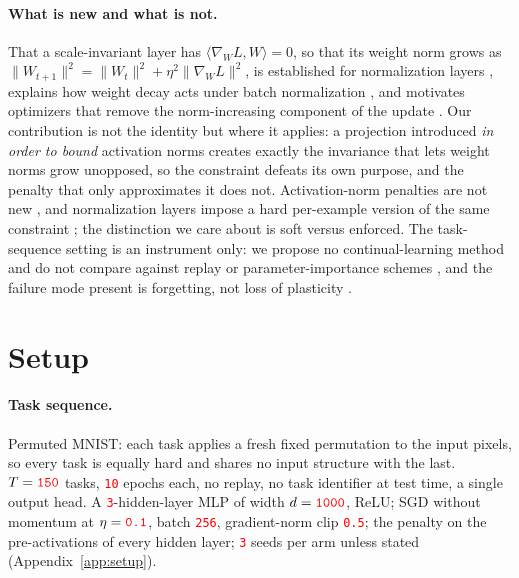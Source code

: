 \documentclass[anon]{opt2026}     %
\newcommand{\PH}[1]{\textcolor{red}{\texttt{#1}}}   %
\begin{document}
\paragraph{What is new and what is not.} That a scale-invariant layer has
$\langle \nabla_W L, W\rangle = 0$, so that its weight norm grows as
$\|W_{t+1}\|^2 = \|W_t\|^2 + \eta^2\|\nabla_W L\|^2$, is established for
normalization layers \citep{vanlaarhoven2017l2, hoffer2018norm,
arora2019theoretical}, explains how weight decay acts under batch normalization
\citep{zhang2019three}, and motivates optimizers that remove the norm-increasing
component of the update \citep{heo2021adamp}. Our contribution is not the
identity but where it applies: a projection introduced \emph{in order to bound}
activation norms creates exactly the invariance that lets weight norms grow
unopposed, so the constraint defeats its own purpose, and the penalty that only
approximates it does not. Activation-norm penalties are not new
\citep{merity2018regularizing}, and normalization layers impose a hard
per-example version of the same constraint \citep{ba2016layer,
salimans2016weight}; the distinction we care about is soft versus enforced. The
task-sequence setting \citep{goodfellow2013empirical} is an instrument only: we
propose no continual-learning method and do not compare against replay or
parameter-importance schemes \citep{kirkpatrick2017ewc, zenke2017si}, and the
failure mode present is forgetting, not loss of plasticity \citep{dohare2024loss}.

\section{Setup}
\label{sec:setup}

\paragraph{Task sequence.} Permuted MNIST: each task applies a fresh fixed
permutation to the input pixels, so every task is equally hard and shares no
input structure with the last. $T = \PH{150}$ tasks, \PH{10} epochs each, no
replay, no task identifier at test time, a single output head. A
\PH{3}-hidden-layer MLP of width $d = \PH{1000}$, ReLU; SGD without momentum at
$\eta = \PH{0.1}$, batch \PH{256}, gradient-norm clip \PH{0.5}; the penalty on
the pre-activations of every hidden layer; \PH{3} seeds per arm unless stated
(Appendix~\ref{app:setup}).
\end{document}
